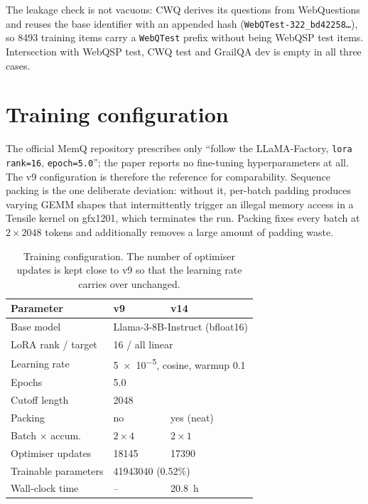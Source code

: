 \documentclass[11pt,a4paper]{article}
\begin{document}
The leakage check is not vacuous: CWQ derives its questions from WebQuestions
and reuses the base identifier with an appended hash
(\texttt{WebQTest-322\_bd42258\ldots}), so \num{8493} training items carry a
\texttt{WebQTest} prefix without being WebQSP test items. Intersection with
WebQSP test, CWQ test and GrailQA dev is empty in all three cases.

\section{Training configuration}

The official MemQ repository prescribes only ``follow the LLaMA-Factory,
\texttt{lora rank=16}, \texttt{epoch=5.0}''; the paper reports no fine-tuning
hyperparameters at all. The v9 configuration is therefore the reference for
comparability. Sequence packing is the one deliberate deviation: without it,
per-batch padding produces varying GEMM shapes that intermittently trigger an
illegal memory access in a Tensile kernel on gfx1201, which terminates the run.
Packing fixes every batch at \(2 \times 2048\) tokens and additionally removes a
large amount of padding waste.

\begin{table}[htbp]
  \centering
  \caption{Training configuration. The number of optimiser updates is kept close
  to v9 so that the learning rate carries over unchanged.}
  \label{tab:config}
  \begin{tabular}{lll}
    \toprule
    Parameter & v9 & v14 \\
    \midrule
    Base model            & \multicolumn{2}{l}{Llama-3-8B-Instruct (bfloat16)} \\
    LoRA rank / target    & \multicolumn{2}{l}{16 / all linear} \\
    Learning rate         & \multicolumn{2}{l}{\num{5e-5}, cosine, warmup 0.1} \\
    Epochs                & \multicolumn{2}{l}{5.0} \\
    Cutoff length         & \multicolumn{2}{l}{2048} \\
    \midrule
    Packing               & no            & yes (neat) \\
    Batch $\times$ accum. & $2 \times 4$  & $2 \times 1$ \\
    Optimiser updates     & 18145         & 17390 \\
    Trainable parameters  & \multicolumn{2}{l}{\num{41943040} (0.52\%)} \\
    Wall-clock time       & {--}          & \SI{20.8}{\hour} \\
    \bottomrule
  \end{tabular}
\end{table}
\end{document}
